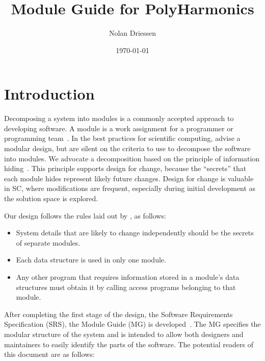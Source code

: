 \documentclass[12pt]{article}
\newcommand{\progname}{PolyHarmonics}
\begin{document}
\title{Module Guide for \progname{}} 
\author{Nolan Driessen}
\date{\today}
	
\maketitle

\tableofcontents

\newpage

\section{Introduction}

Decomposing a system into modules is a commonly accepted approach to developing
software.  A module is a work assignment for a programmer or programming
team~\citep{ParnasEtAl1984}.  In the best practices for scientific computing,
\citet{WilsonEtAl2013} advise a modular design, but are silent on the criteria
to use to decompose the software into modules.  We advocate a decomposition
based on the principle of information hiding~\citep{Parnas1972a}.  This
principle supports design for change, because the ``secrets'' that each module
hides represent likely future changes.  Design for change is valuable in SC,
where modifications are frequent, especially during initial development as the
solution space is explored.  

Our design follows the rules laid out by \citet{ParnasEtAl1984}, as follows:
\begin{itemize}
\item System details that are likely to change independently should be the
  secrets of separate modules.
\item Each data structure is used in only one module.
\item Any other program that requires information stored in a module's data
  structures must obtain it by calling access programs belonging to that module.
\end{itemize}

After completing the first stage of the design, the Software Requirements
Specification (SRS), the Module Guide (MG) is developed~\citep{ParnasEtAl1984}. 
The MG
specifies the modular structure of the system and is intended to allow both
designers and maintainers to easily identify the parts of the software.  The
potential readers of this document are as follows:
\end{document}

